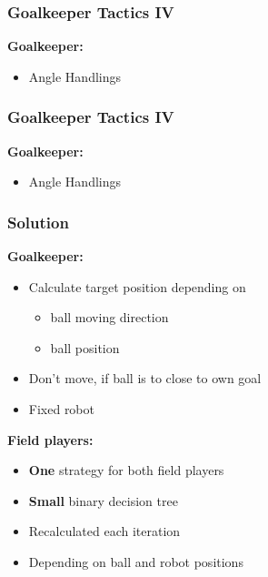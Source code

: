 \documentclass[hyperref={pdfpagelabels=false},compress]{beamer}
\begin{document}
\begin{frame}
		\frametitle{Goalkeeper Tactics IV}
		\textbf{Goalkeeper:}\\
		\begin{itemize}
				\item Angle Handlings
		\end{itemize}
		\begin{center}
				
		\end{center}
\end{frame}

\begin{frame}
		\frametitle{Goalkeeper Tactics IV}
		\textbf{Goalkeeper:}\\
		\begin{itemize}
				\item Angle Handlings
		\end{itemize}
		\begin{center}
				
		\end{center}
\end{frame}

\begin{frame}
    \frametitle{Solution}
    \textbf{Goalkeeper:}\\
    \begin{itemize}
        \item Calculate target position depending on\\
        \begin{itemize}
            \item ball moving direction\\
            \item ball position\\
        \end{itemize}
        \item Don't move, if ball is to close to own goal\\
        \item Fixed robot
    \end{itemize}
    \textbf{Field players:}\\
    \begin{itemize}
        \item \textbf{One} strategy for both field players
        \item \textbf{Small} binary decision tree
        \item Recalculated each iteration
        \item Depending on ball and robot positions
    \end{itemize}
\end{frame}
\end{document}
